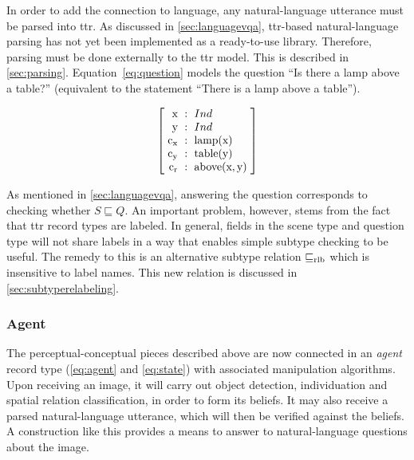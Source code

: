 In order to add the  connection to language, any natural-language utterance must be parsed into \gls{ttr}.
As discussed in \autoref{sec:languagevqa}, \gls{ttr}-based natural-language parsing has not yet been implemented as a ready-to-use library.
Therefore, parsing must be done externally to the \gls{ttr} model.
This is described in \autoref{sec:parsing}.
Equation~\ref{eq:question} models the question ``Is there a lamp above a table?'' (equivalent to the statement ``There is a lamp above a table'').

\begin{equation}\label{eq:question}
\rec{
    \text{x} &:& Ind \\
    \text{y} &:& Ind \\
    \text{c}_\text{x} &:& \text{lamp}(\text{x}) \\
    \text{c}_\text{y} &:& \text{table}(\text{y}) \\
    \text{c}_\text{r} &:& \text{above}(\text{x}, \text{y}) \\
    }
\end{equation}

As mentioned in \autoref{sec:languagevqa}, answering the question corresponds to checking whether $S \sqsubseteq Q$.
An important problem, however, stems from the fact that \gls{ttr} record types are labeled.
In general, fields in the scene type and question type will not share labels in a way that enables simple subtype checking to be useful.
The remedy to this is an alternative subtype relation $\mathrel{\sqsubseteq_\text{rlb}}$ which is insensitive to label names.
This new relation is discussed in \autoref{sec:subtyperelabeling}.



\subsubsection{Agent}
\label{sec:agent}

The perceptual-conceptual pieces described above are now connected in an \textit{agent} record type (\autoref{eq:agent} and \autoref{eq:state}) with associated manipulation algorithms.
Upon receiving an image, it will carry out object detection, individuation and spatial relation classification, in order to form its beliefs.
It may also receive a parsed natural-language utterance, which will then be verified against the beliefs.
A construction like this provides a means to answer to natural-language questions about the image.

